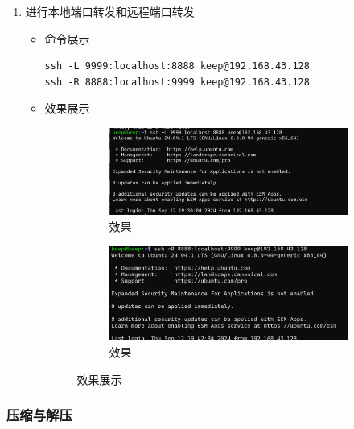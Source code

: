 \documentclass[UTF8]{ctexart}
\begin{document}
\begin{enumerate}
  \item 进行本地端口转发和远程端口转发
  \begin{itemize}
  \item 命令展示
  \begin{verbatim}
ssh -L 9999:localhost:8888 keep@192.168.43.128
ssh -R 8888:localhost:9999 keep@192.168.43.128

  \end{verbatim}
\item 效果展示
 \begin{figure}[H]
    \centering
    \begin{subfigure}[b]{0.48\textwidth}
        \includegraphics[width=\textwidth]{181} %
        \caption{效果}
        \label{fig:left}
    \end{subfigure}
    \hfill
    \begin{subfigure}[b]{0.48\textwidth}
        \includegraphics[width=\textwidth]{182} %
        \caption{效果}
        \label{fig:right}
    \end{subfigure}
    \caption{效果展示}
    \label{fig:side_by_side}
\end{figure}
  \end{itemize}
\end{enumerate}

\subsubsection{压缩与解压}
\end{document}
